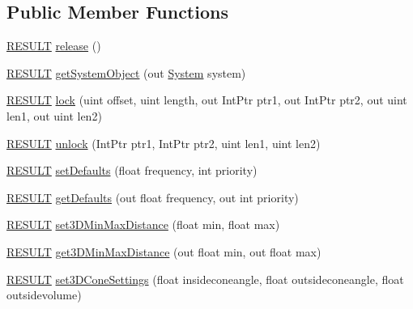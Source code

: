 \subsection*{Public Member Functions}
\begin{DoxyCompactItemize}
\item 
\hyperlink{namespace_f_m_o_d_a305d1176ef3f8c8815861a60407ac33d}{R\+E\+S\+U\+LT} \hyperlink{class_f_m_o_d_1_1_sound_ac0a53cb864be3225344389253ddcc218}{release} ()
\item 
\hyperlink{namespace_f_m_o_d_a305d1176ef3f8c8815861a60407ac33d}{R\+E\+S\+U\+LT} \hyperlink{class_f_m_o_d_1_1_sound_a03c701a8cf017444f7fa3c83c2270dc6}{get\+System\+Object} (out \hyperlink{class_f_m_o_d_1_1_system}{System} system)
\item 
\hyperlink{namespace_f_m_o_d_a305d1176ef3f8c8815861a60407ac33d}{R\+E\+S\+U\+LT} \hyperlink{class_f_m_o_d_1_1_sound_ae830bce396bbd6a7ed1cc79995930120}{lock} (uint offset, uint length, out Int\+Ptr ptr1, out Int\+Ptr ptr2, out uint len1, out uint len2)
\item 
\hyperlink{namespace_f_m_o_d_a305d1176ef3f8c8815861a60407ac33d}{R\+E\+S\+U\+LT} \hyperlink{class_f_m_o_d_1_1_sound_a5348c2c882cf50c93bdfcebf027697f8}{unlock} (Int\+Ptr ptr1, Int\+Ptr ptr2, uint len1, uint len2)
\item 
\hyperlink{namespace_f_m_o_d_a305d1176ef3f8c8815861a60407ac33d}{R\+E\+S\+U\+LT} \hyperlink{class_f_m_o_d_1_1_sound_a6db1692dcaa21b55e874db24ac22ed83}{set\+Defaults} (float frequency, int priority)
\item 
\hyperlink{namespace_f_m_o_d_a305d1176ef3f8c8815861a60407ac33d}{R\+E\+S\+U\+LT} \hyperlink{class_f_m_o_d_1_1_sound_aa1ab1d7631c888c1e58e4ee53e947ff9}{get\+Defaults} (out float frequency, out int priority)
\item 
\hyperlink{namespace_f_m_o_d_a305d1176ef3f8c8815861a60407ac33d}{R\+E\+S\+U\+LT} \hyperlink{class_f_m_o_d_1_1_sound_a56eb46703dbbacf951e20f15fd0afa81}{set3\+D\+Min\+Max\+Distance} (float min, float max)
\item 
\hyperlink{namespace_f_m_o_d_a305d1176ef3f8c8815861a60407ac33d}{R\+E\+S\+U\+LT} \hyperlink{class_f_m_o_d_1_1_sound_aadb55c0f0f6769697def6d332e867922}{get3\+D\+Min\+Max\+Distance} (out float min, out float max)
\item 
\hyperlink{namespace_f_m_o_d_a305d1176ef3f8c8815861a60407ac33d}{R\+E\+S\+U\+LT} \hyperlink{class_f_m_o_d_1_1_sound_a663512bb4de90f93f8d8cc13bde975b6}{set3\+D\+Cone\+Settings} (float insideconeangle, float outsideconeangle, float outsidevolume)
\item 

\end{DoxyCompactItemize}
